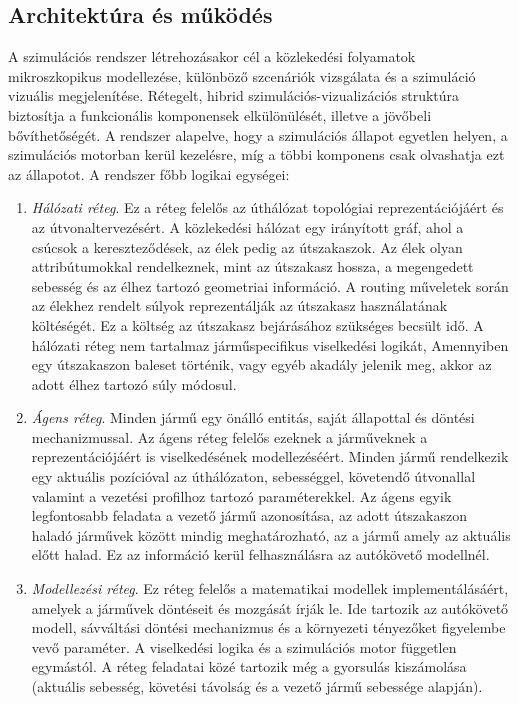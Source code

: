 \documentclass[14pt,a4paper]{extarticle}
\begin{document}
\subsection{Architektúra és működés}
A szimulációs rendszer létrehozásakor cél a közlekedési folyamatok mikroszkopikus modellezése, különböző szcenáriók vizsgálata és a szimuláció vizuális megjelenítése. Rétegelt, hibrid szimulációs-vizualizációs struktúra biztosítja a funkcionális komponensek elkülönülését, illetve a jövőbeli bővíthetőségét. A rendszer alapelve, hogy a szimulációs állapot egyetlen helyen, a szimulációs motorban kerül kezelésre, míg a többi komponens csak olvashatja ezt az állapotot. A rendszer főbb logikai egységei:
\begin{enumerate}
    \item \textit{Hálózati réteg}. Ez a réteg felelős az úthálózat topológiai reprezentációjáért és az útvonaltervezésért. A közlekedési hálózat egy irányított gráf, ahol a csúcsok a kereszteződések, az élek pedig az útszakaszok. Az élek olyan attribútumokkal rendelkeznek, mint az útszakasz hossza, a megengedett sebesség és az élhez tartozó geometriai információ.
    A routing műveletek során az élekhez rendelt súlyok reprezentálják az útszakasz használatának költéségét. Ez a költség az útszakasz bejárásához szükséges becsült idő. A hálózati réteg nem tartalmaz járműspecifikus viselkedési logikát, Amennyiben egy útszakaszon baleset történik, vagy egyéb akadály jelenik meg, akkor az adott élhez tartozó súly módosul.
    \item \textit{Ágens réteg}. Minden jármű egy önálló entitás, saját állapottal és döntési mechanizmussal. Az ágens réteg felelős ezeknek a járműveknek a reprezentációjáért is viselkedésének modellezéséért.
    Minden jármű rendelkezik egy aktuális pozícióval az úthálózaton, sebességgel, követendő útvonallal valamint a vezetési profilhoz tartozó paraméterekkel. Az ágens egyik legfontosabb feladata a vezető jármű azonosítása, az adott útszakaszon haladó járművek között mindig meghatározható, az a jármű amely az aktuális előtt halad. Ez az információ kerül felhasználásra az autókövető modellnél.
    \item \textit{Modellezési réteg}. Ez réteg felelős a matematikai modellek implementálásáért, amelyek a járművek döntéseit és mozgását írják le. Ide tartozik az autókövető modell, sávváltási döntési mechanizmus és a környezeti tényezőket figyelembe vevő paraméter. A viselkedési logika és a szimulációs motor független egymástól. A réteg feladatai közé tartozik még a gyorsulás kiszámolása (aktuális sebesség, követési távolság és a vezető jármű sebessége alapján).

\end{enumerate}
\end{document}
